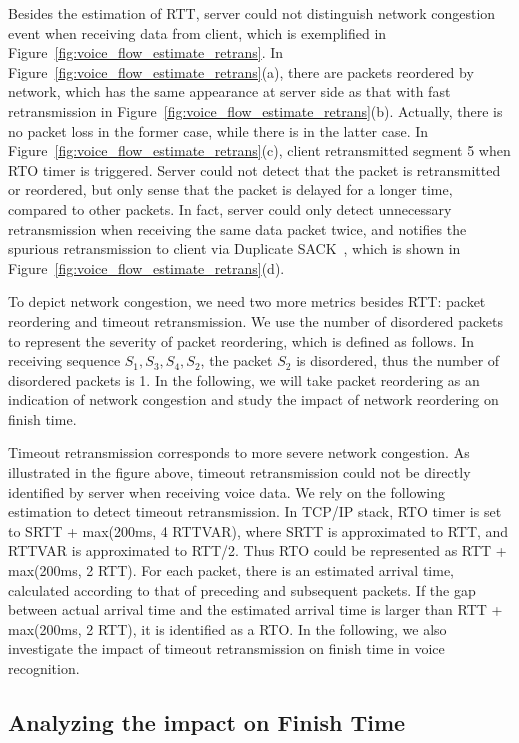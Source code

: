 Besides the estimation of RTT, server could not distinguish network congestion event when receiving data from client, which is exemplified in Figure~\ref{fig:voice_flow_estimate_retrans}. In Figure~\ref{fig:voice_flow_estimate_retrans}(a), there are packets reordered by network, which has the same appearance at server side as that with fast retransmission in Figure~\ref{fig:voice_flow_estimate_retrans}(b). Actually, there is no packet loss in the former case, while there is in the latter case. In Figure~\ref{fig:voice_flow_estimate_retrans}(c), client retransmitted segment 5 when RTO timer is triggered. Server could not detect that the packet is retransmitted or reordered, but only sense that the packet is delayed for a longer time, compared to other packets. In fact, server could only detect unnecessary retransmission when receiving the same data packet twice, and notifies the spurious retransmission to client via Duplicate SACK~\cite{rfc3078}, which is shown in Figure~\ref{fig:voice_flow_estimate_retrans}(d).

To depict network congestion, we need two more metrics besides RTT: packet reordering and timeout retransmission. We use the number of disordered packets to represent the severity of packet reordering, which is defined as follows. In receiving sequence $S_1, S_3, S_4, S_2$, the packet $S_2$ is disordered, thus the number of disordered packets is 1. In the following, we will take packet reordering as an indication of network congestion and study the impact of network reordering on finish time.

Timeout retransmission corresponds to more severe network congestion. As illustrated in the figure above, timeout retransmission could not be directly identified by server when receiving voice data. We rely on the following estimation to detect timeout retransmission. In TCP/IP stack, RTO timer is set to SRTT + max(200ms, 4 RTTVAR)\cite{rfc62982011computing}, where SRTT is approximated to RTT, and RTTVAR is approximated to RTT/2. Thus RTO could be represented as RTT + max(200ms, 2 RTT). For each packet, there is an estimated arrival time, calculated according to that of preceding and subsequent packets. If the gap between actual arrival time and the estimated arrival time is larger than RTT + max(200ms, 2 RTT), it is identified as a RTO. In the following, we also investigate the impact of timeout retransmission on finish time in voice recognition.

\subsection{Analyzing the impact on Finish Time}


